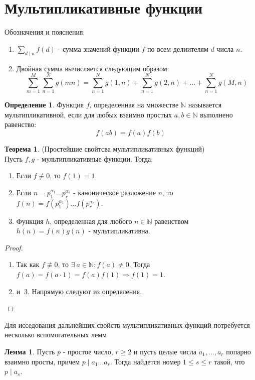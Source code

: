 \documentclass[a4paper, 12pt]{article}
\newcommand{\N}{\mathbb{N}}
\renewcommand{\div}{\mid}
\newcommand\tab[1][.5cm]{\hspace*{#1}}
\theoremstyle{definition}
\newtheorem{definition}{Определение}[section]
\newtheorem{theorem}{Теорема}[section]
\newtheorem{lemma}{Лемма}[section]
\begin{document}
    \section{Мультипликативные функции}
    Обозначения и пояснения:
    \begin{enumerate}
        \item $\sum\limits_{d\div n}f(d)$ - сумма значений функции $f$ по всем делиителям $d$ числа $n$.
        \item Двойная сумма вычисляется следующим образом: \[\sum\limits_{m=1}^M\sum\limits_{n=1}^Ng(mn)=\sum\limits_{n=1}^Ng(1,n)+\sum\limits_{n=1}^Ng(2,n)+\dots +\sum\limits_{n=1}^Ng(M,n)\]
    \end{enumerate}
    \begin{definition}
        Функция $f$, определенная на множестве $\N$ называется мультипликативной, если для любых взаимно простых $a,b\in \N$ выполнено равенство:
        $$f(ab)=f(a)f(b)$$
    \end{definition}
    \begin{theorem}(Простейшие свойтсва мультипликативных функций) \label{th6.1}\\
        Пусть $f,g$ - мультипликативные функции. Тогда:
        \begin{enumerate}
            \item Если $f\not\equiv 0$, то $f(1)=1$.
            \item Если $n=p_1^{\alpha_1}\dots p_r^{\alpha_r}$ - каноническое разложение $n$, то $f(n)=f(p_1^{\alpha_1})\dots f(p_r^{\alpha_r})$.
            \item Функция $h$, определенная для любого $n\in \N$ равенством\\ $h(n)=f(n)g(n)$ - мультипликативна. 
        \end{enumerate}
        \begin{proof}\tab
            \begin{enumerate}
            \item Так как $f\not\equiv 0$, то $\exists\ a\in \N: f(a)\ne 0$. Тогда\\ $f(a)=f(a\cdot 1)=f(a)f(1) \Rightarrow f(1)=1$.
            \item и$\ $ 3. Напрямую следуют из определения.
            \end{enumerate}
        \end{proof}
    \end{theorem}
    Для исседования дальнейших свойств мультипликативных функций потребуется несколько вспомогательных лемм
    \begin{lemma} \label{lemma6.1}
        Пусть $p$ - простое число, $r\geq 2$ и пусть целые числа $a_1,\dots, a_r$ попарно взаимно просты, причем $p \div a_1\dots a_r$. Тогда найдется номер $1\leq s\leq r$ такой, что $p\div a_s$.
    \end{lemma} 
\end{document}
